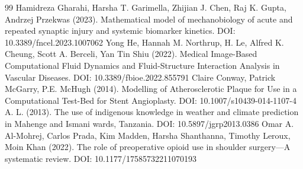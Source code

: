 \documentclass[preprint,12pt]{elsarticle}
\begin{document}
\begin{thebibliography}{99}
 Hamidreza Gharahi, Harsha T. Garimella, Zhijian J. Chen, Raj K. Gupta, Andrzej Przekwas (2023). Mathematical model of mechanobiology of acute and repeated synaptic injury and systemic biomarker kinetics. DOI: 10.3389/fncel.2023.1007062
 Yong He, Hannah M. Northrup, H. Le, Alfred K. Cheung, Scott A. Berceli, Yan Tin Shiu (2022). Medical Image-Based Computational Fluid Dynamics and Fluid-Structure Interaction Analysis in Vascular Diseases. DOI: 10.3389/fbioe.2022.855791
 Claire Conway, Patrick McGarry, P.E. McHugh (2014). Modelling of Atherosclerotic Plaque for Use in a Computational Test-Bed for Stent Angioplasty. DOI: 10.1007/s10439-014-1107-4
 A. L. (2013). The use of indigenous knowledge in weather and climate prediction in Mahenge and Ismani wards, Tanzania. DOI: 10.5897/jgrp2013.0386
 Omar A. Al-Mohrej, Carlos Prada, Kim Madden, Harsha Shanthanna, Timothy Leroux, Moin Khan (2022). The role of preoperative opioid use in shoulder surgery—A systematic review. DOI: 10.1177/17585732211070193
\end{thebibliography}

\clearpage
\end{document}
